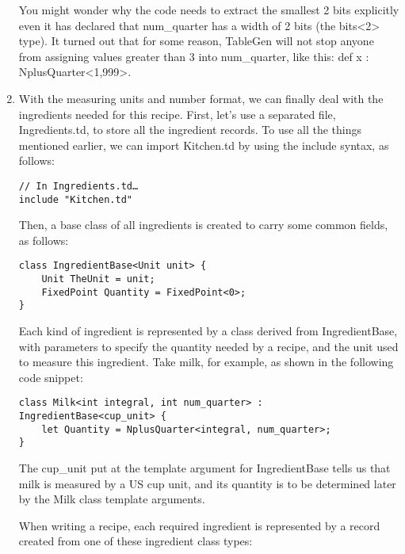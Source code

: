 \begin{enumerate}
\begin{tcolorbox}[colback=blue!5!white,colframe=blue!75!black, fonttitle=\bfseries,title=Note]
\hspace*{0.7cm}You might wonder why the code needs to extract the smallest 2 bits explicitly even it has declared that num\_quarter has a width of 2 bits (the bits<2> type). It turned out that for some reason, TableGen will not stop anyone from assigning values greater than 3 into num\_quarter, like this: def x : NplusQuarter<1,999>.
\end{tcolorbox}

\item With the measuring units and number format, we can finally deal with the ingredients needed for this recipe. First, let's use a separated file, Ingredients.td, to store all the ingredient records. To use all the things mentioned earlier, we can import Kitchen.td by using the include syntax, as follows:

\begin{lstlisting}[style=styleCXX]
// In Ingredients.td…
include "Kitchen.td"
\end{lstlisting}

Then, a base class of all ingredients is created to carry some common fields, as follows:

\begin{lstlisting}[style=styleCXX]
class IngredientBase<Unit unit> {
	Unit TheUnit = unit;
	FixedPoint Quantity = FixedPoint<0>;
}
\end{lstlisting}

Each kind of ingredient is represented by a class derived from IngredientBase, with parameters to specify the quantity needed by a recipe, and the unit used to measure this ingredient. Take milk, for example, as shown in the following code snippet:

\begin{lstlisting}[style=styleCXX]
class Milk<int integral, int num_quarter> :
IngredientBase<cup_unit> {
	let Quantity = NplusQuarter<integral, num_quarter>;
}
\end{lstlisting}

The cup\_unit put at the template argument for IngredientBase tells us that milk is measured by a US cup unit, and its quantity is to be determined later by the Milk class template arguments.

When writing a recipe, each required ingredient is represented by a record created from one of these ingredient class types:


\end{enumerate}
